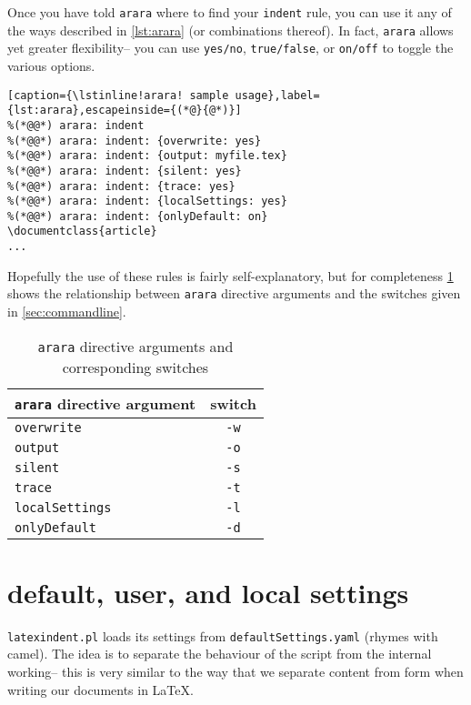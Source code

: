 Once you have told \lstinline!arara! where to find your \lstinline!indent! rule, 
you can use it any of the ways described in \cref{lst:arara} (or combinations thereof). 
In fact, \lstinline!arara! allows yet greater flexibility-- you can use \lstinline!yes/no!, \lstinline!true/false!, or \lstinline!on/off! to toggle the various options.
 	 	 	 	 	
\begin{lstlisting}[caption={\lstinline!arara! sample usage},label={lst:arara},escapeinside={(*@}{@*)}]
%(*@@*) arara: indent
%(*@@*) arara: indent: {overwrite: yes}
%(*@@*) arara: indent: {output: myfile.tex}
%(*@@*) arara: indent: {silent: yes}
%(*@@*) arara: indent: {trace: yes}
%(*@@*) arara: indent: {localSettings: yes}
%(*@@*) arara: indent: {onlyDefault: on}
\documentclass{article}
...
\end{lstlisting}
 	 	 	 	 	
Hopefully the use of these rules is fairly self-explanatory, but for completeness
\cref{tab:orbsandswitches} shows the relationship between \lstinline!arara! directive arguments and the 
switches given in \cref{sec:commandline}.
 	 	 	 	 	
\begin{table}[!ht]
	\centering
	\caption{\lstinline!arara! directive arguments and corresponding switches}
	\label{tab:orbsandswitches}
	\begin{tabular}{lc}
		\toprule
		\lstinline!arara! directive argument & switch         \\
		\midrule
		\lstinline!overwrite!                & \lstinline!-w! \\
		\lstinline!output!                   & \lstinline!-o! \\
		\lstinline!silent!                   & \lstinline!-s! \\
		\lstinline!trace!                    & \lstinline!-t! \\
		\lstinline!localSettings!            & \lstinline!-l! \\
		\lstinline!onlyDefault!              & \lstinline!-d! \\
		\bottomrule
	\end{tabular}
\end{table}
\section{default, user, and local settings}\label{sec:defuseloc}
\lstinline!latexindent.pl! loads its settings from \lstinline!defaultSettings.yaml! 
(rhymes with camel). The idea is to separate the behaviour of the script 
from the internal working-- this is very similar to the way that we separate content
from form when writing our documents in \LaTeX.
     
